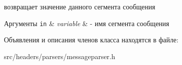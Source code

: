 возвращает значение данного сегмента сообщения 


\begin{DoxyParams}[1]{Аргументы}
\mbox{\tt in}  & {\em variable} & -\/ имя сегмента сообщения \\
\hline
\end{DoxyParams}


Объявления и описания членов класса находятся в файле\+:\begin{DoxyCompactItemize}
\item 
src/headers/parsers/messageparser.\+h\end{DoxyCompactItemize}
